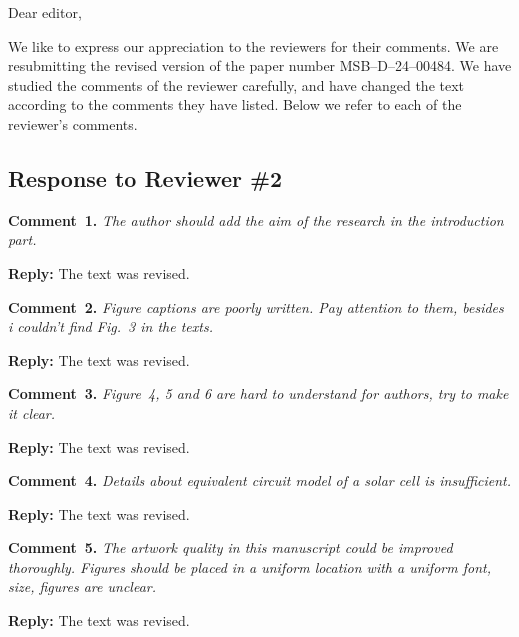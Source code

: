 \documentclass[a4paper,fleqn]{cas-sc}
\begin{document}
\shorttitle{}


Dear editor,

We like to express our appreciation to the reviewers for their comments.
We are resubmitting the revised version of the paper number MSB--D--24--00484.
We have studied the comments of the reviewer carefully, and have changed the text according to the comments they
have listed.
Below we refer to each of the reviewer’s comments.


\subsection*{Response to Reviewer \#2 }

\noindent
\textcolor[rgb]{0.00,0.50,1.00}{\textbf{Comment~1.}}
\emph{The author should add the aim of the research in the introduction part.}

\noindent
\textcolor[rgb]{0.51,0.00,0.00}{\textbf{Reply:}}
The text was revised.

\vspace{1cm}
\noindent
\textcolor[rgb]{0.00,0.50,1.00}{\textbf{Comment~2.}}
\emph{Figure captions are poorly written. Pay attention to them, besides i couldn't find Fig.~3 in the texts.}

\noindent
\textcolor[rgb]{0.51,0.00,0.00}{\textbf{Reply:}}
The text was revised.

\vspace{1cm}
\noindent
\textcolor[rgb]{0.00,0.50,1.00}{\textbf{Comment~3.}}
\emph{Figure~4, 5 and 6 are hard to understand for authors, try to make it clear.}

\noindent
\textcolor[rgb]{0.51,0.00,0.00}{\textbf{Reply:}}
The text was revised.

\vspace{1cm}
\noindent
\textcolor[rgb]{0.00,0.50,1.00}{\textbf{Comment~4.}}
\emph{Details about equivalent circuit model of a solar cell is insufficient.}

\noindent
\textcolor[rgb]{0.51,0.00,0.00}{\textbf{Reply:}}
The text was revised.

\vspace{1cm}
\noindent
\textcolor[rgb]{0.00,0.50,1.00}{\textbf{Comment~5.}}
\emph{The artwork quality in this manuscript could be improved thoroughly. 
Figures should be placed in a uniform location with a uniform font, size, figures are unclear.}

\noindent
\textcolor[rgb]{0.51,0.00,0.00}{\textbf{Reply:}}
The text was revised.
\end{document}
